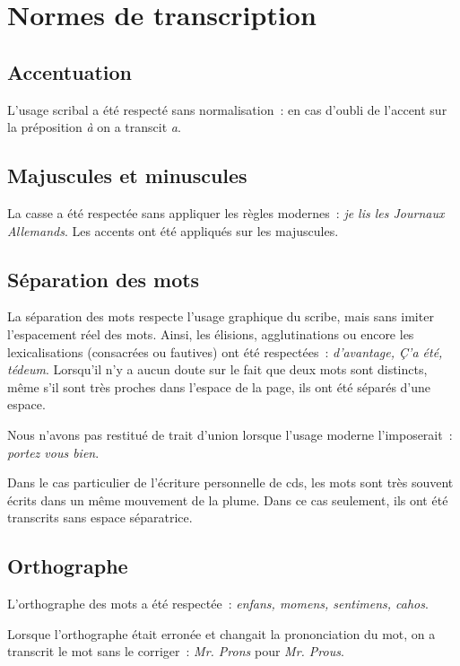 \documentclass[a4paper,12pt,twoside]{book}
\begin{document}
	
	\chapter{Normes de transcription}
		\label{normes-trans}
	
		\section{Accentuation}
			L'usage scribal a été respecté sans normalisation~: en cas d'oubli de l'accent sur la préposition \textit{à} on a transcit \textit{a}.
		
		\section{Majuscules et minuscules}
			La casse a été respectée sans appliquer les règles modernes~: \textit{je lis les Journaux Allemands}. Les accents ont été appliqués sur les majuscules.
		
		\section{Séparation des mots}
			La séparation des mots respecte l'usage graphique du scribe, mais sans imiter l'espacement réel des mots. Ainsi, les élisions, agglutinations ou encore les lexicalisations (consacrées ou fautives) ont été respectées~: \textit{d'avantage, Ç'a été, tédeum}. Lorsqu'il n'y a aucun doute sur le fait que deux mots sont distincts, même s'il sont très proches dans l'espace de la page, ils ont été séparés d'une espace.
		
			Nous n'avons pas restitué de trait d'union lorsque l'usage moderne l'imposerait~: \textit{portez vous bien}.
	
			Dans le cas particulier de l'écriture personnelle de \gls{cds}, les mots sont très souvent écrits dans un même mouvement de la plume. Dans ce cas seulement, ils ont été transcrits sans espace séparatrice.
				
		\section{Orthographe}
			L'orthographe des mots a été respectée~: \textit{enfans, momens, sentimens, cahos}.
			
			Lorsque l'orthographe était erronée et changait la prononciation du mot, on a transcrit le mot sans le corriger~: \textit{Mr. Prons} pour \textit{Mr. Prous}.
		
\end{document}
